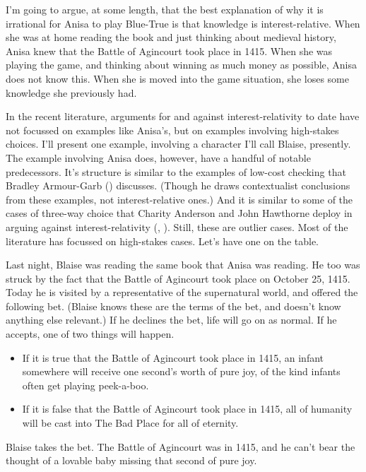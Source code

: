 \documentclass[
  10pt,
  letterpaper,
  twoside]{scrbook}
\providecommand{\tightlist}{%
  \setlength{\itemsep}{0pt}\setlength{\parskip}{0pt}}\usepackage{longtable,booktabs,array}
\begin{document}
I'm going to argue, at some length, that the best explanation of why it
is irrational for Anisa to play Blue-True is that knowledge is
interest-relative. When she was at home reading the book and just
thinking about medieval history, Anisa knew that the Battle of Agincourt
took place in 1415. When she was playing the game, and thinking about
winning as much money as possible, Anisa does not know this. When she is
moved into the game situation, she loses some knowledge she previously
had.

In the recent literature, arguments for and against interest-relativity
to date have not focussed on examples like Anisa's, but on examples
involving high-stakes choices. I'll present one example, involving a
character I'll call Blaise, presently. The example involving Anisa does,
however, have a handful of notable predecessors. It's structure is
similar to the examples of low-cost checking that Bradley Armour-Garb
() discusses. (Though he draws
contextualist conclusions from these examples, not interest-relative
ones.) And it is similar to some of the cases of three-way choice that
Charity Anderson and John Hawthorne deploy in arguing against
interest-relativity (,
). Still, these are outlier
cases. Most of the literature has focussed on high-stakes cases. Let's
have one on the table.

Last night, Blaise was reading the same book that Anisa was reading. He
too was struck by the fact that the Battle of Agincourt took place on
October 25, 1415. Today he is visited by a representative of the
supernatural world, and offered the following bet. (Blaise knows these
are the terms of the bet, and doesn't know anything else relevant.) If
he declines the bet, life will go on as normal. If he accepts, one of
two things will happen.

\begin{itemize}
\tightlist
\item
  If it is true that the Battle of Agincourt took place in 1415, an
  infant somewhere will receive one second's worth of pure joy, of the
  kind infants often get playing peek-a-boo.
\item
  If it is false that the Battle of Agincourt took place in 1415, all of
  humanity will be cast into The Bad Place for all of eternity.
\end{itemize}

Blaise takes the bet. The Battle of Agincourt was in 1415, and he can't
bear the thought of a lovable baby missing that second of pure joy.
\end{document}
